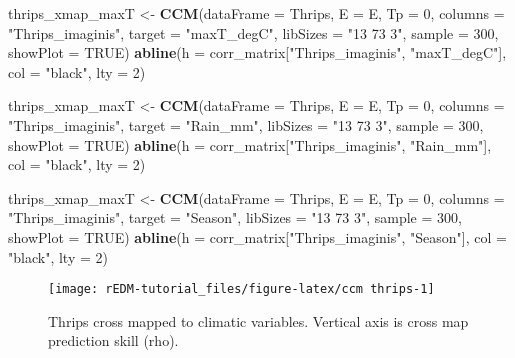 \documentclass[]{article}
\newenvironment{Shaded}{\begin{snugshade}}{\end{snugshade}}
\newcommand{\DataTypeTok}[1]{\textcolor[rgb]{0.13,0.29,0.53}{#1}}
\newcommand{\DecValTok}[1]{\textcolor[rgb]{0.00,0.00,0.81}{#1}}
\newcommand{\KeywordTok}[1]{\textcolor[rgb]{0.13,0.29,0.53}{\textbf{#1}}}
\newcommand{\NormalTok}[1]{#1}
\newcommand{\OtherTok}[1]{\textcolor[rgb]{0.56,0.35,0.01}{#1}}
\newcommand{\StringTok}[1]{\textcolor[rgb]{0.31,0.60,0.02}{#1}}
\begin{document}
\begin{Shaded}
\begin{Highlighting}[]
\NormalTok{thrips_xmap_maxT <-}\StringTok{ }\KeywordTok{CCM}\NormalTok{(}\DataTypeTok{dataFrame =}\NormalTok{ Thrips, }\DataTypeTok{E =}\NormalTok{ E, }\DataTypeTok{Tp =} \DecValTok{0}\NormalTok{, }\DataTypeTok{columns =} \StringTok{"Thrips_imaginis"}\NormalTok{, }
    \DataTypeTok{target =} \StringTok{"maxT_degC"}\NormalTok{, }\DataTypeTok{libSizes =} \StringTok{"13 73 3"}\NormalTok{, }\DataTypeTok{sample =} \DecValTok{300}\NormalTok{, }\DataTypeTok{showPlot =} \OtherTok{TRUE}\NormalTok{)}
\KeywordTok{abline}\NormalTok{(}\DataTypeTok{h =}\NormalTok{ corr_matrix[}\StringTok{"Thrips_imaginis"}\NormalTok{, }\StringTok{"maxT_degC"}\NormalTok{], }\DataTypeTok{col =} \StringTok{"black"}\NormalTok{, }\DataTypeTok{lty =} \DecValTok{2}\NormalTok{)}

\NormalTok{thrips_xmap_maxT <-}\StringTok{ }\KeywordTok{CCM}\NormalTok{(}\DataTypeTok{dataFrame =}\NormalTok{ Thrips, }\DataTypeTok{E =}\NormalTok{ E, }\DataTypeTok{Tp =} \DecValTok{0}\NormalTok{, }\DataTypeTok{columns =} \StringTok{"Thrips_imaginis"}\NormalTok{, }
    \DataTypeTok{target =} \StringTok{"Rain_mm"}\NormalTok{, }\DataTypeTok{libSizes =} \StringTok{"13 73 3"}\NormalTok{, }\DataTypeTok{sample =} \DecValTok{300}\NormalTok{, }\DataTypeTok{showPlot =} \OtherTok{TRUE}\NormalTok{)}
\KeywordTok{abline}\NormalTok{(}\DataTypeTok{h =}\NormalTok{ corr_matrix[}\StringTok{"Thrips_imaginis"}\NormalTok{, }\StringTok{"Rain_mm"}\NormalTok{], }\DataTypeTok{col =} \StringTok{"black"}\NormalTok{, }\DataTypeTok{lty =} \DecValTok{2}\NormalTok{)}

\NormalTok{thrips_xmap_maxT <-}\StringTok{ }\KeywordTok{CCM}\NormalTok{(}\DataTypeTok{dataFrame =}\NormalTok{ Thrips, }\DataTypeTok{E =}\NormalTok{ E, }\DataTypeTok{Tp =} \DecValTok{0}\NormalTok{, }\DataTypeTok{columns =} \StringTok{"Thrips_imaginis"}\NormalTok{, }
    \DataTypeTok{target =} \StringTok{"Season"}\NormalTok{, }\DataTypeTok{libSizes =} \StringTok{"13 73 3"}\NormalTok{, }\DataTypeTok{sample =} \DecValTok{300}\NormalTok{, }\DataTypeTok{showPlot =} \OtherTok{TRUE}\NormalTok{)}
\KeywordTok{abline}\NormalTok{(}\DataTypeTok{h =}\NormalTok{ corr_matrix[}\StringTok{"Thrips_imaginis"}\NormalTok{, }\StringTok{"Season"}\NormalTok{], }\DataTypeTok{col =} \StringTok{"black"}\NormalTok{, }\DataTypeTok{lty =} \DecValTok{2}\NormalTok{)}
\end{Highlighting}
\end{Shaded}

\begin{figure}[h]

{\centering \texttt{[image: rEDM-tutorial\_files/figure-latex/ccm thrips-1]} 

}

\caption{Thrips cross mapped to climatic variables. Vertical axis is cross map prediction skill (rho).}\label{fig:ccm thrips}
\end{figure}
\end{document}
